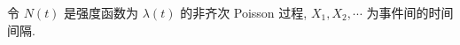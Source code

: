 \documentclass[boxes]{homework}
\begin{document}
\begin{problem}
    令 $N(t)$ 是强度函数为 $\lambda(t)$ 的非齐次 Poisson 过程, $X_1, X_2, \cdots$ 为事件间的时间间隔.
\end{problem}
\end{document}
